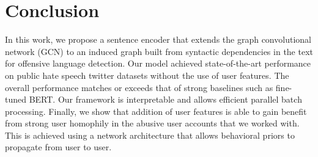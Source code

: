 \section{Conclusion}
In this work, we propose a sentence encoder that extends the graph convolutional network (GCN) to an induced graph built from syntactic dependencies in the text for offensive language detection.
Our model achieved state-of-the-art performance on public hate speech twitter datasets without the use of user features. The overall performance matches or exceeds that of strong baselines such as fine-tuned BERT.
Our framework is interpretable and allows efficient parallel batch processing. Finally, we show that addition of user features is able to gain benefit from strong user homophily in the abusive user accounts that we worked with. This is achieved using a network architecture that allows behavioral priors to propagate from user to user.
